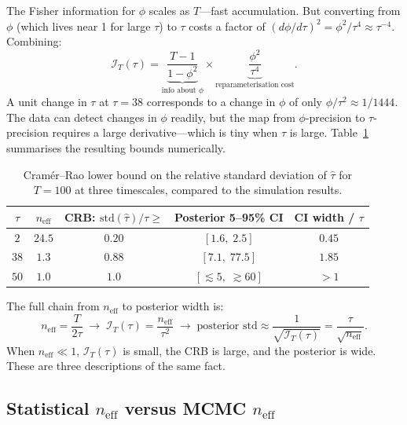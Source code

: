 \documentclass[11pt, a4paper]{article}
\begin{document}
The Fisher information for $\phi$ scales as $T$---fast accumulation.
But converting from $\phi$ (which lives near 1 for large $\tau$) to $\tau$ costs
a factor of $(d\phi/d\tau)^2 = \phi^2/\tau^4 \approx \tau^{-4}$.
Combining:
\begin{equation}
    \mathcal{I}_T(\tau)
    = \underbrace{\frac{T-1}{1-\phi^2}}_{\displaystyle\text{info about }\phi}
    \times
    \underbrace{\frac{\phi^2}{\tau^4}}_{\displaystyle\text{reparameterisation cost}}.
\end{equation}
A unit change in $\tau$ at $\tau = 38$ corresponds to a change in $\phi$ of only
$\phi/\tau^2 \approx 1/1444$.
The data can detect changes in $\phi$ readily, but the map from $\phi$-precision to
$\tau$-precision requires a large derivative---which is tiny when $\tau$ is large.
Table~\ref{tab:fisher_tau} summarises the resulting bounds numerically.

\begin{table}[h!]
\centering
\caption{Cram\'er--Rao lower bound on the relative standard deviation of $\hat\tau$
         for $T = 100$ at three timescales, compared to the simulation results.}
\label{tab:fisher_tau}
\begin{tabular}{ccccc}
\toprule
$\tau$ & $n_\mathrm{eff}$ & CRB: $\mathrm{std}(\hat\tau)/\tau \geq$ &
Posterior 5--95\% CI & CI width / $\tau$ \\
\midrule
$2$  & $24.5$ & $0.20$ & $[1.6,\;2.5]$    & $0.45$ \\
$38$ & $1.3$  & $0.88$ & $[7.1,\;77.5]$   & $1.85$ \\
$50$ & $1.0$  & $1.0$  & $[\lesssim 5,\;\gtrsim 60]$ & $>1$ \\
\bottomrule
\end{tabular}
\end{table}

The full chain from $n_\mathrm{eff}$ to posterior width is:
\begin{equation}
    n_\mathrm{eff} = \frac{T}{2\tau}
    \;\longrightarrow\;
    \mathcal{I}_T(\tau) = \frac{n_\mathrm{eff}}{\tau^2}
    \;\longrightarrow\;
    \text{posterior std} \approx \frac{1}{\sqrt{\mathcal{I}_T(\tau)}}
    = \frac{\tau}{\sqrt{n_\mathrm{eff}}}.
\end{equation}
When $n_\mathrm{eff} \ll 1$, $\mathcal{I}_T(\tau)$ is small, the CRB is large, and the
posterior is wide.
These are three descriptions of the same fact.

\subsection{Statistical $n_\mathrm{eff}$ versus MCMC $n_\mathrm{eff}$}
\label{subsec:neff_two_kinds}
\end{document}
